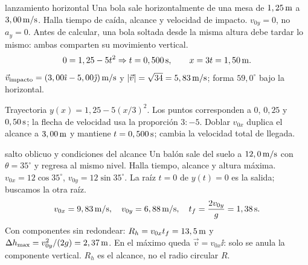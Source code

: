 \documentclass[11pt,a4paper]{article}
\begin{document}
\begin{examplebox}{lanzamiento horizontal}
 Una bola sale horizontalmente de una mesa de
$1,25\,\mathrm{m}$ a $3,00\,\mathrm{m/s}$. Halla tiempo de ca\'ida, alcance y velocidad de impacto.
\solutionblock
{} $v_{0y}=0$, no $a_y=0$. Antes de calcular, una bola soltada desde
la misma altura debe tardar lo mismo: ambas comparten su movimiento vertical.
\[
0=1,25-5t^2\Rightarrow t=0,500\,\mathrm{s},\qquad
x=3t=1,50\,\mathrm{m}.
\]
$\vec v_{\mathrm{impacto}}=(3,00\hat{\imath}-5,00\hat{\jmath})\,\mathrm{m/s}$ y
$|\vec v|=\sqrt{34}=5,83\,\mathrm{m/s}$; forma $59,0^\circ$ bajo la horizontal.
\begin{center}
\end{center}
Trayectoria $y(x)=1,25-5(x/3)^2$. Los puntos corresponden a $0$, $0,25$ y
$0,50\,\mathrm{s}$; la flecha de velocidad usa la proporci\'on $3:-5$.
 Doblar $v_{0x}$ duplica el alcance a $3,00\,\mathrm{m}$
y mantiene $t=0,500\,\mathrm{s}$; cambia la velocidad total de llegada.
\end{examplebox}

\begin{examplebox}{salto oblicuo y condiciones del alcance}
 Un bal\'on sale del suelo a $12,0\,\mathrm{m/s}$ con
$\theta=35^\circ$ y regresa al mismo nivel. Halla tiempo, alcance y altura m\'axima.
\solutionblock
{} $v_{0x}=12\cos35^\circ$, $v_{0y}=12\sin35^\circ$.
La ra\'iz $t=0$ de $y(t)=0$ es la salida; buscamos la otra ra\'iz.
\[
v_{0x}=9,83\,\mathrm{m/s},\quad v_{0y}=6,88\,\mathrm{m/s},\quad
t_f=\frac{2v_{0y}}g=1,38\,\mathrm{s}.
\]
Con componentes sin redondear:
$R_h=v_{0x}t_f=13,5\,\mathrm{m}$ y
$\Delta h_{\max}=v_{0y}^2/(2g)=2,37\,\mathrm{m}$.
 En el m\'aximo queda $\vec v=v_{0x}\ii$:
solo se anula la componente vertical. $R_h$ es el alcance, no el radio circular $R$.
\end{examplebox}
\end{document}

